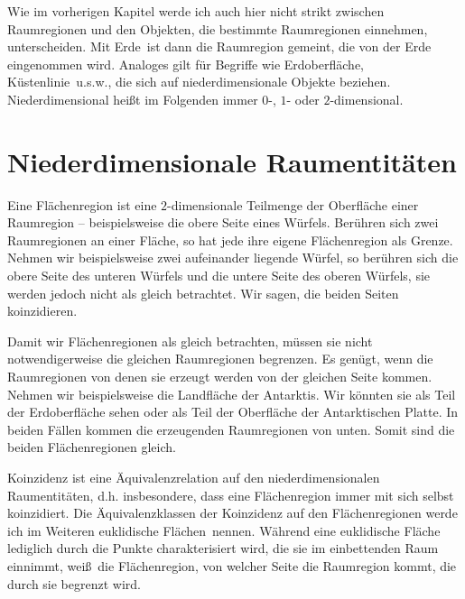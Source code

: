         Wie im vorherigen Kapitel werde ich auch hier nicht strikt zwischen Raumregionen und den Objekten, die bestimmte Raumregionen einnehmen, unterscheiden. Mit \glqq Erde\grqq\ ist dann die Raumregion gemeint, die von der Erde eingenommen wird. Analoges gilt für Begriffe wie \glqq Erdoberfläche\grqq , \glqq Küstenlinie\grqq\ u.s.w., die sich auf niederdimensionale Objekte beziehen.
        Niederdimensional heißt im Folgenden immer $0$-, $1$- oder $2$-dimensional.
	
    \section{Niederdimensionale Raumentitäten}\label{sec:niederdimensionale-re}
        Eine Flächenregion ist eine $2$-dimensionale Teilmenge der Oberfläche einer Raumregion -- beispielsweise die obere Seite eines Würfels. 
        Berühren sich zwei Raumregionen an einer Fläche, so hat jede ihre eigene Flächenregion als Grenze. Nehmen wir beispielsweise zwei aufeinander liegende Würfel, so berühren sich die obere Seite des unteren Würfels und die untere Seite des oberen Würfels, sie werden jedoch nicht als gleich betrachtet. Wir sagen, die beiden Seiten koinzidieren.
        
        Damit wir Flächenregionen als gleich betrachten, müssen sie nicht notwendigerweise die gleichen Raumregionen begrenzen. 
        Es genügt, wenn die Raumregionen von denen sie erzeugt werden \glqq von der gleichen Seite kommen\grqq .
        Nehmen wir beispielsweise die Landfläche der Antarktis. Wir könnten sie als Teil der Erdoberfläche sehen oder als Teil der Oberfläche der Antarktischen Platte. In beiden Fällen kommen die erzeugenden Raumregionen \glqq von unten\grqq . Somit sind die beiden Flächenregionen gleich.
    
        Koinzidenz ist eine Äquivalenzrelation auf den niederdimensionalen Raumentitäten, d.h. insbesondere, dass eine Flächenregion immer mit sich selbst koinzidiert. 
        Die Äquivalenzklassen der Koinzidenz auf den Flächenregionen werde ich im Weiteren \glqq euklidische Flächen\grqq\ nennen. 
        Während eine euklidische Fläche lediglich durch die Punkte charakterisiert wird, die sie im einbettenden Raum einnimmt, \glqq weiß\grqq\ die Flächenregion, von welcher Seite die Raumregion kommt, die durch sie begrenzt wird.


